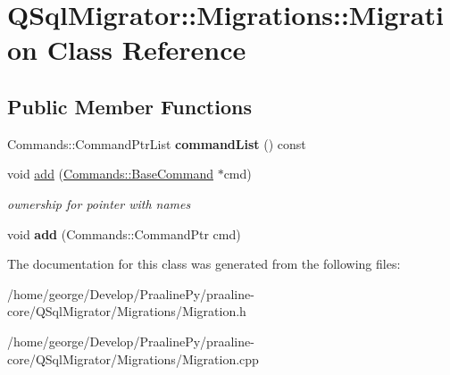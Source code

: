 \hypertarget{class_q_sql_migrator_1_1_migrations_1_1_migration}{}\section{Q\+Sql\+Migrator\+:\+:Migrations\+:\+:Migration Class Reference}
\label{class_q_sql_migrator_1_1_migrations_1_1_migration}
\subsection*{Public Member Functions}
\begin{DoxyCompactItemize}
\item 
\mbox{\label{class_q_sql_migrator_1_1_migrations_1_1_migration_a69d8a1447bfad0a8e845fd2db8f2e697}} 
Commands\+::\+Command\+Ptr\+List {\bfseries command\+List} () const
\item 
\mbox{\label{class_q_sql_migrator_1_1_migrations_1_1_migration_ab40402ceee9d2527fa62aeb82a4968ae}} 
void \hyperlink{class_q_sql_migrator_1_1_migrations_1_1_migration_ab40402ceee9d2527fa62aeb82a4968ae}{add} (\hyperlink{class_q_sql_migrator_1_1_commands_1_1_base_command}{Commands\+::\+Base\+Command} $\ast$cmd)
\begin{DoxyCompactList}\small\item\em ownership for pointer with names \end{DoxyCompactList}\item 
\mbox{\label{class_q_sql_migrator_1_1_migrations_1_1_migration_a36887e61981b5c6a2b6fca36d50a678f}} 
void {\bfseries add} (Commands\+::\+Command\+Ptr cmd)
\end{DoxyCompactItemize}


The documentation for this class was generated from the following files\+:\begin{DoxyCompactItemize}
\item 
/home/george/\+Develop/\+Praaline\+Py/praaline-\/core/\+Q\+Sql\+Migrator/\+Migrations/Migration.\+h\item 
/home/george/\+Develop/\+Praaline\+Py/praaline-\/core/\+Q\+Sql\+Migrator/\+Migrations/Migration.\+cpp\end{DoxyCompactItemize}
